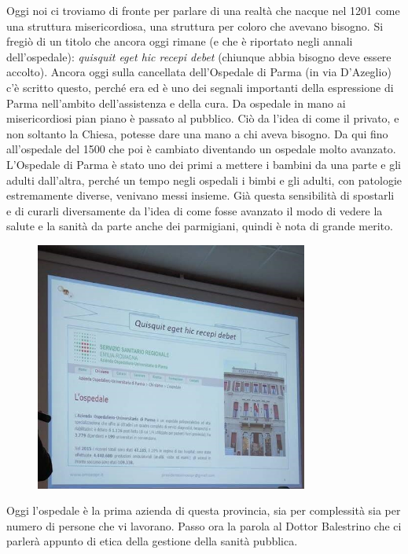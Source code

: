 Oggi noi ci troviamo di fronte per parlare di una realtà che nacque nel
1201 come una struttura misericordiosa, una struttura per coloro che
avevano bisogno. Si fregiò di un titolo che ancora oggi rimane (e che è
riportato negli annali dell'ospedale): \emph{quisquit eget hic recepi
debet} (chiunque abbia bisogno deve essere accolto). Ancora oggi sulla
cancellata dell'Ospedale di Parma (in via D'Azeglio) c'è scritto questo,
perché era ed è uno dei segnali importanti della espressione di Parma
nell'ambito dell'assistenza e della cura. Da ospedale in mano ai
misericordiosi pian piano è passato al pubblico. Ciò da l'idea di come
il privato, e non soltanto la Chiesa, potesse dare una mano a chi aveva
bisogno. Da qui fino all'ospedale del 1500 che poi è cambiato diventando
un ospedale molto avanzato. L'Ospedale di Parma è stato uno dei primi a
mettere i bambini da una parte e gli adulti dall'altra, perché un tempo
negli ospedali i bimbi e gli adulti, con patologie estremamente diverse,
venivano messi insieme. Già questa sensibilità di spostarli e di curarli
diversamente da l'idea di come fosse avanzato il modo di vedere la
salute e la sanità da parte anche dei parmigiani, quindi è nota di
grande merito.

 \begin{figure}[!ht]
\centering
	\includegraphics[width=0.8\textwidth]{32/image2.jpeg}
	\end{figure}

Oggi l'ospedale è la prima azienda di questa provincia, sia per
complessità sia per numero di persone che vi lavorano. Passo ora la
parola al Dottor Balestrino che ci parlerà appunto di etica della
gestione della sanità pubblica.

